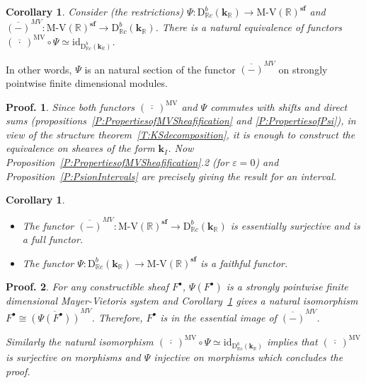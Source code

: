 \documentclass[a4paper, english, 11pt]{article}
\newcommand{\kk}[0]{\textbf{k}}
\newcommand{\0}{\vec{0}}
\newcommand{\R}[0]{\mathbb{R}}
\newcommand{\D}[0]{\text{D}}
\newcommand{\s}{\textbf{sf}}
\newtheorem*{pf}{Proof.} }
\newtheorem{cor}[prop]{Corollary}
\begin{document}
\begin{cor}\label{C:MVcircPsiisId} Consider (the restrictions) $\Psi: \D^b_{\R c}(\kk_\R)\to \text{M-V}(\R)^{\s}$ and  $\overline{(-)}^{MV}: \text{M-V}(\R)^{\s} \to  \D^b_{\R c}(\kk_\R)$. 
 There is a natural equivalence of functors 
 $(\overline{~\cdot~ })^{\text{MV}} \circ \Psi\simeq \text{id}_{\D^b_{\R c}(\kk_\R)}$. 
\end{cor}
In other words, $\Psi$ is an natural section of the functor $\overline{(-)}^{MV}$ on strongly pointwise finite dimensional modules.  
\begin{pf}
 Since both functors $(\overline{~\cdot~ })^{\text{MV}}$ and $ \Psi $ commutes with shifts and direct sums (propositions~\ref{P:PropertiesofMVSheafification} and \ref{P:PropertiesofPsi}), in view of the structure theorem~\ref{T:KSdecomposition}, it is enough to construct the equivalence on sheaves of the form $\kk_{I}$. Now Proposition~\ref{P:PropertiesofMVSheafification}.2 (for $\varepsilon=0$) and Proposition~\ref{P:PsionIntervals} are precisely giving the result for an interval.
\end{pf}
\begin{cor}\label{C:fullorfiathful}
\begin{itemize}\item The functor  $\overline{(-)}^{MV}: \text{M-V}(\R)^{\s} \to  \D^b_{\R c}(\kk_\R)$ is essentially surjective and is a full functor. 
\item The functor $ \Psi:\D^b_{\R c}(\kk_\R)\to  \text{M-V}(\R)^{\s}$  is a faithful functor. 
\end{itemize}\end{cor}
\begin{pf}
For  any    constructible sheaf $F^\bullet$, $\Psi(F^\bullet)$ is a 
strongly pointwise finite dimensional Mayer-Vietoris system and Corollary~\ref{C:MVcircPsiisId} gives a natural isomorphism $F^\bullet \cong \overline{(\Psi(F^\bullet))}^{MV} $. Therefore, $F^\bullet$ is in the essential image of $\overline{(-)}^{MV}$.  

\smallskip

Similarly the natural isomorphism  $(\overline{~\cdot~ })^{\text{MV}} \circ \Psi \simeq \text{id}_{\D^b_{\R c}(\kk_\R)}$ implies that $(\overline{~\cdot~ })^{\text{MV}}$ is surjective on morphisms and  $\Psi$ injective on morphisms which concludes the proof.
\end{pf}
\end{document}
